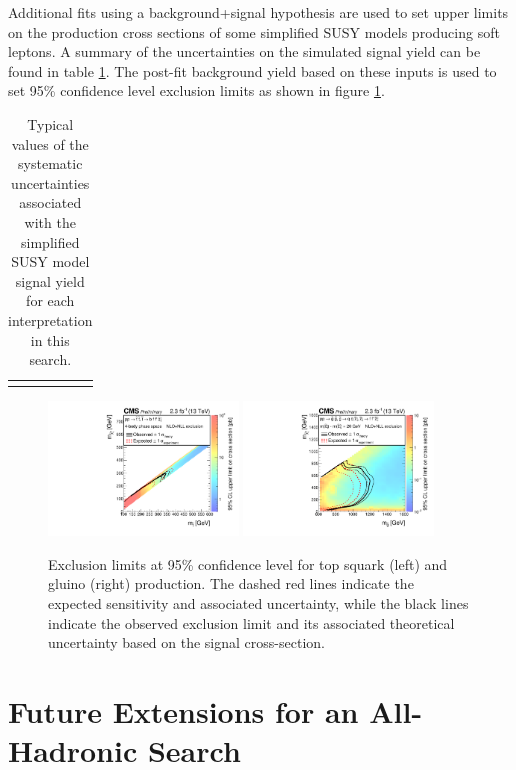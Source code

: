 Additional fits using a background+signal hypothesis are used to set upper limits on the production cross sections of some simplified SUSY models producing soft leptons. A summary of the uncertainties on the simulated signal yield can be found in table \ref{tbl:softsignalSyst}. The post-fit background yield based on these inputs is used to set 95\% confidence level exclusion limits as shown in figure \ref{fig:softlimits}.

\begin{table}
	\centering
	\begin{tabular}[]{l c r}
		\fm{Summary table of soft signal systematics} 
	\end{tabular}
	\caption{Typical values of the systematic uncertainties associated with the simplified SUSY model signal yield for each interpretation in this search.}
	\label{tbl:softsignalSyst}
\end{table}
\begin{figure}
	\centering
	\includegraphics[width=0.45\textwidth]{soft/figs/T2-4bdXSEC}
	\includegraphics[width=0.45\textwidth]{soft/figs/T5qqqqWWXSEC}
	\caption{Exclusion limits at 95\% confidence level for top squark (left) and gluino (right) production. The dashed red lines indicate the expected sensitivity and associated uncertainty, while the black lines indicate the observed exclusion limit and its associated theoretical uncertainty based on the signal cross-section.}
	\label{fig:softlimits}
\end{figure}

\section{Future Extensions for an All-Hadronic Search}
\label{sec:future}

